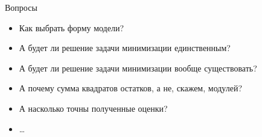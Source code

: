 \documentclass[ignorenonframetext,]{beamer}
\begin{document}
\begin{frame}{Вопросы}

\begin{itemize}
\item
  Как выбрать форму модели?
\item
  А будет ли решение задачи минимизации единственным?
\item
  А будет ли решение задачи минимизации вообще существовать?
\item
  А почему сумма квадратов остатков, а не, скажем, модулей?
\item
  А насколько точны полученные оценки?
\item
  \ldots{}
\end{itemize}

\end{frame}
\end{document}
